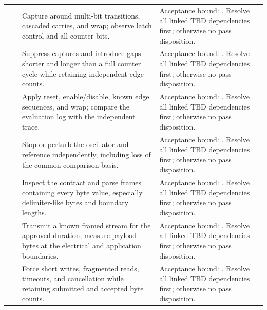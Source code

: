\begin{landscape}
\begin{tabularx}{\linewidth}{L{2cm}L{3cm}Y Y}
 & \par {} & Capture around multi-bit transitions, cascaded carries, and wrap; observe latch control and all counter bits. & Acceptance bound: . Resolve all linked TBD dependencies first; otherwise no pass disposition.\\
 & \par {} & Suppress captures and introduce gaps shorter and longer than a full counter cycle while retaining independent edge counts. & Acceptance bound: . Resolve all linked TBD dependencies first; otherwise no pass disposition.\\
 & \par {} & Apply reset, enable/disable, known edge sequences, and wrap; compare the evaluation log with the independent trace. & Acceptance bound: . Resolve all linked TBD dependencies first; otherwise no pass disposition.\\
 & \par {} & Stop or perturb the oscillator and reference independently, including loss of the common comparison basis. & Acceptance bound: . Resolve all linked TBD dependencies first; otherwise no pass disposition.\\
 & \par {} & Inspect the contract and parse frames containing every byte value, especially delimiter-like bytes and boundary lengths. & Acceptance bound: . Resolve all linked TBD dependencies first; otherwise no pass disposition.\\
 & \par {} & Transmit a known framed stream for the approved duration; measure payload bytes at the electrical and application boundaries. & Acceptance bound: . Resolve all linked TBD dependencies first; otherwise no pass disposition.\\
 & \par {} & Force short writes, fragmented reads, timeouts, and cancellation while retaining submitted and accepted byte counts. & Acceptance bound: . Resolve all linked TBD dependencies first; otherwise no pass disposition.\\

\end{tabularx}
\end{landscape}
